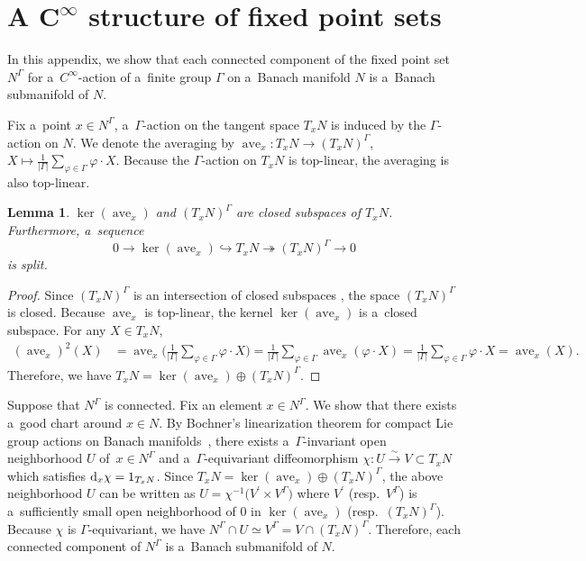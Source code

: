 \documentclass[10pt,a4paper]{amsart}
\numberwithin{equation}{section}
\newtheorem{Lemma}[Theorem]{Lemma}
\theoremstyle{definition}
\newcommand{\ave}{\operatorname{ave}}
\begin{document}
\section[A C\string^infty structure of fixed point sets]{A $\boldsymbol{C^{\infty}}$ structure of fixed point sets}\label{Appendix C}

In this appendix, we show that each connected component of the fixed point set $N^{\Gamma}$ for a~$C^{\infty}$-action of a~finite group $\Gamma$ on a~Banach manifold $N$ is a~Banach submanifold of $N$.

Fix a~point $x \in N^{\Gamma}$, a~$\Gamma$-action on the tangent space $T_xN$ is induced by the $\Gamma$-action on $N$.
We denote the averaging by $\ave_x \colon T_xN \to (T_xN)^{\Gamma}$, $ X \mapsto \frac{1}{|\Gamma|} \sum_{\varphi \in \Gamma} \varphi \cdot X$.
Because the $\Gamma$-action on $T_xN$ is top-linear, the averaging is also top-linear.

\begin{Lemma}
 $\ker (\ave_x)$ and $(T_xN)^{\Gamma}$ are closed subspaces of $T_xN$.
 Furthermore, a~sequence
 \[0 \to \ker(\ave_x) \hookrightarrow T_xN \twoheadrightarrow (T_xN)^{\Gamma} \to 0\]
 is split.
\end{Lemma}

\begin{proof}
 Since $(T_xN)^{\Gamma}$ is an intersection of closed subspaces ,
 the space $(T_xN)^{\Gamma}$ is closed.
 Because $\ave_x$ is top-linear, the kernel $\ker(\ave_x)$ is a~closed subspace.
 For any $X \in T_xN$,
 \begin{align*}
 (\ave_x)^2(X) &= \ave_x\bigg(\frac{1}{|\Gamma|}\sum_{\varphi \in \Gamma}\varphi\cdot X \bigg)
 = \frac{1}{|\Gamma|}\sum_{\varphi \in \Gamma} \ave_x(\varphi \cdot X)
 = \frac{1}{|\Gamma|} \sum_{\varphi \in \Gamma} \varphi \cdot X
 = \ave_x(X).
 \end{align*}
 Therefore, we have $T_xN = \ker(\ave_x) \oplus (T_xN)^{\Gamma}$.
\end{proof}

Suppose that $N^{\Gamma}$ is connected. Fix an element $x \in N^{\Gamma}$.
We show that there exists a~good chart around $x \in N$.
By Bochner's linearization theorem for compact Lie group actions on Banach manifolds~\cite[Proposition~3.1.4]{diez2019normal}, there exists a~$\Gamma$-invariant open neighborhood $U$ of~${x \in N^{\Gamma}}$
and a~$\Gamma$-equivariant diffeomorphism $\chi \colon U \stackrel{\sim}{\rightarrow} V \subset T_xN $ which satisfies ${\rm d}_x\chi =1_{T_xN}$.
Since $T_xN = \ker(\ave_x) \oplus (T_xN)^{\Gamma}$, the above neighborhood $U$ can be written as $ U= \chi^{-1}\bigl(V^{\prime}\times V^{\Gamma}\bigr)$
where $V^{\prime}$ \big(resp.\ $V^{\Gamma}$\big) is a~sufficiently small open neighborhood of $0$ in $\ker(\ave_x)$ \big(resp.\ $(T_xN)^{\Gamma}$\big).
Because $\chi$ is $\Gamma$-equivariant, we have $N^{\Gamma} \cap U \simeq V^{\Gamma} = V \cap (T_xN)^{\Gamma}$.
Therefore, each connected component of $N^{\Gamma}$ is a~Banach submanifold of $N$.
\end{document}
